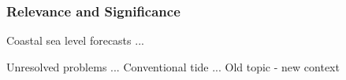 \begin{frame}
\frametitle{Relevance and Significance}

Coastal sea level forecasts ...
\vfill{}

Unresolved problems ...
\vfill{}
Conventional tide ...
\vfill{}
Old topic - new context 

\end{frame}